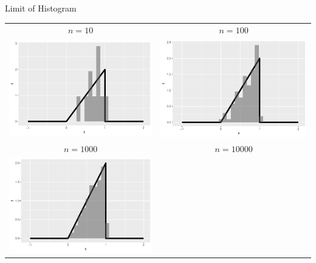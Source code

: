 \begin{frame}
  \begin{block}{Limit of Histogram}
  \begin{center}
    \begin{tabular}{cc}
      $n=10$
      & $n=100$\\
      \includegraphics[height=.325\textheight]{figure/example-16-4-1}
      & \includegraphics[height=.325\textheight]{figure/example-16-4-2}\\
      $n=1000$
      & $n=10000$\\
      \includegraphics[height=.325\textheight]{figure/example-16-4-3}

\end{tabular}
\end{center}
\end{block}
\end{frame}

